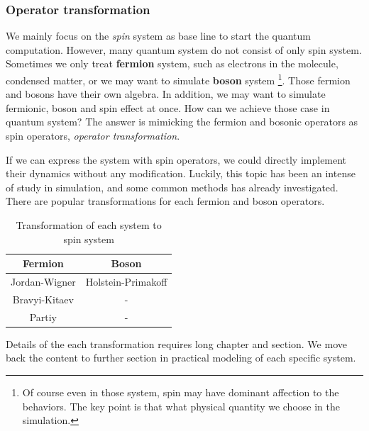 \subsubsection{Operator transformation}

We mainly focus on the \textit{spin} system 
as base line to start the quantum computation.
However, many quantum system do not consist of only spin system.
Sometimes we only treat \textbf{fermion} system, such as electrons in the molecule,
 condensed matter, or we may want to simulate \textbf{boson} system
\footnote{Of course even in those system, spin may have dominant affection 
to the behaviors. The key point is that what physical quantity we choose in the simulation.
}.
Those fermion and bosons have their own algebra.
In addition, we may want to simulate fermionic, boson and spin effect 
at once. How can we achieve those case in quantum system?
The answer is mimicking the fermion and bosonic operators 
as spin operators, \textit{operator transformation}.

If we can express the system with spin operators, 
we could directly implement their dynamics
without any modification. 
Luckily, this topic has been an intense of study 
in simulation, and some common methods has already investigated.
There are popular transformations for each fermion and boson operators.

\begin{table}[!ht]
    \centering
    \caption{Transformation of each system to spin system}
    \begin{tabular}{c|c}
        \hline
        Fermion                             & Boson\\
        \hline
        \hline
        Jordan-Wigner                       & Holstein-Primakoff\\
        Bravyi-Kitaev{\cite{BRAVYI2002210}} & - \\
        Partiy                              & -\\
        \hline
    \end{tabular}
\end{table}

Details of the each transformation requires 
long chapter and section. 
We move back the content to further section in practical 
modeling of each specific system.
